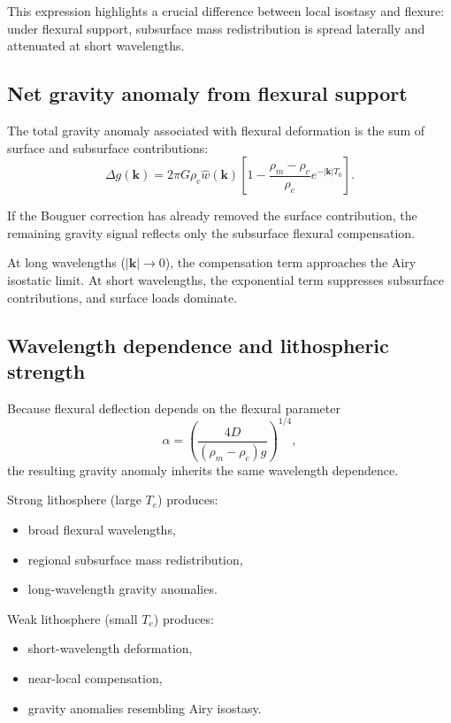 This expression highlights a crucial difference between local isostasy and flexure: under flexural support, subsurface mass redistribution is spread laterally and attenuated at short wavelengths.

\subsection{Net gravity anomaly from flexural support}

The total gravity anomaly associated with flexural deformation is the sum of surface and subsurface contributions:
\begin{equation}
\Delta g(\mathbf{k})
=
2\pi G \rho_c \hat{w}(\mathbf{k})
\left[
1 -
\frac{\rho_m - \rho_c}{\rho_c}
e^{-|\mathbf{k}|T_0}
\right].
\end{equation}

If the Bouguer correction has already removed the surface contribution, the remaining gravity signal reflects only the subsurface flexural compensation.

At long wavelengths (\(|\mathbf{k}| \to 0\)), the compensation term approaches the Airy isostatic limit. At short wavelengths, the exponential term suppresses subsurface contributions, and surface loads dominate.

\subsection{Wavelength dependence and lithospheric strength}

Because flexural deflection depends on the flexural parameter
\[
\alpha = \left( \frac{4D}{(\rho_m - \rho_c) g} \right)^{1/4},
\]
the resulting gravity anomaly inherits the same wavelength dependence.

Strong lithosphere (large \(T_e\)) produces:
\begin{itemize}
    \item broad flexural wavelengths,
    \item regional subsurface mass redistribution,
    \item long-wavelength gravity anomalies.
\end{itemize}

Weak lithosphere (small \(T_e\)) produces:
\begin{itemize}
    \item short-wavelength deformation,
    \item near-local compensation,
    \item gravity anomalies resembling Airy isostasy.
\end{itemize}

